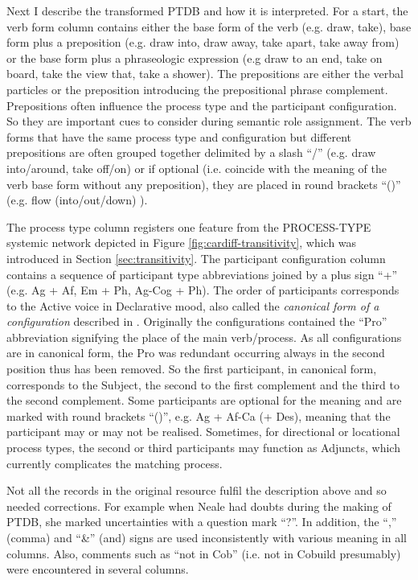     Next I describe the transformed PTDB and how it is interpreted. For a start, the verb form column contains either the base form of the verb (e.g. draw, take), base form plus a preposition (e.g. draw into, draw away, take apart, take away from) or the base form plus a phraseologic expression (e.g draw to an end, take on board, take the view that, take a shower). The prepositions are either the verbal particles or the preposition introducing the prepositional phrase complement. Prepositions often influence the process type and the participant configuration. So they are important cues to consider during semantic role assignment. The verb forms that have the same process type and configuration but different prepositions are often grouped together delimited by a slash ``/'' (e.g. draw into/around, take off/on) or if optional (i.e. coincide with the meaning of the verb base form without any preposition), they are placed in round brackets ``()'' (e.g. flow (into/out/down) ).

    The process type column registers one feature from the PROCESS-TYPE systemic network depicted in Figure \ref{fig:cardiff-transitivity}, which was introduced in Section \ref{sec:transitivity}. The participant configuration column contains a sequence of participant type abbreviations joined by a plus sign ``+'' (e.g. Ag + Af, Em + Ph, Ag-Cog + Ph). The order of participants corresponds to the Active voice in Declarative mood, also called the \textit{canonical form of a configuration} described in \citet{Fawcett2009}. Originally the configurations contained the ``Pro'' abbreviation signifying the place of the main verb/process. As all configurations are in canonical form, the Pro was redundant occurring always in the second position thus has been removed. So the first participant, in canonical form, corresponds to the Subject, the second to the first complement and the third to the second complement. Some participants are optional for the meaning and are marked with round brackets ``()'', e.g. Ag + Af-Ca (+ Des), meaning that the participant may or may not be realised. Sometimes, for directional or locational process types, the second or third participants may function as Adjuncts, which currently complicates the matching process.

    Not all the records in the original resource fulfil the description above and so needed corrections. For example when Neale had doubts during the making of PTDB, she marked uncertainties with a question mark ``?''. In addition, the ``,'' (comma) and ``\&'' (and) signs are used inconsistently with various meaning in all columns. Also, comments such as ``not in Cob'' (i.e. not in Cobuild presumably) were encountered in several columns.

